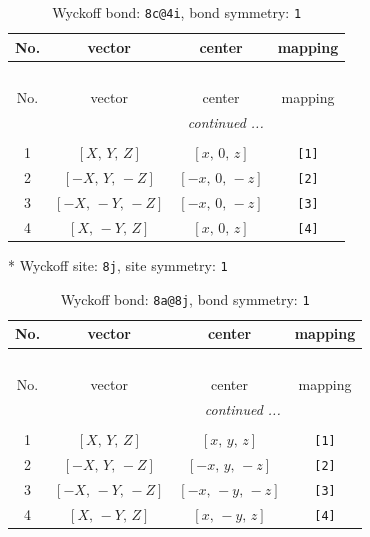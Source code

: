 \documentclass[fleqn,8pt]{jsarticle}
\begin{document}
\begin{longtable}{cccc}
\caption{Wyckoff bond: {\tt 8c@4i}, bond symmetry: {\tt 1}}
 \\
 \hline \hline
No. & vector & center & mapping \\ \hline \endfirsthead

\multicolumn{3}{l}{\tablename\ \thetable{}} \\
 \hline \hline
No. & vector & center & mapping \\ \hline \endhead

 \hline \hline
\multicolumn{3}{r}{\footnotesize\it continued ...} \\ \endfoot

 \hline \hline
\multicolumn{3}{r}{} \\ \endlastfoot

1 & $\left[ X,\, Y,\, Z \right]$ & $\left[ x,\, 0,\, z \right]$ & {\tt [1]} \\ \hline
2 & $\left[ - X,\, Y,\, - Z \right]$ & $\left[ - x,\, 0,\, - z \right]$ & {\tt [2]} \\ \hline
3 & $\left[ - X,\, - Y,\, - Z \right]$ & $\left[ - x,\, 0,\, - z \right]$ & {\tt [3]} \\ \hline
4 & $\left[ X,\, - Y,\, Z \right]$ & $\left[ x,\, 0,\, z \right]$ & {\tt [4]} \\
\end{longtable}
* Wyckoff site: {\tt 8j}, site symmetry: {\tt 1}
\renewcommand{\arraystretch}{1.2}
\begin{longtable}{cccc}
\caption{Wyckoff bond: {\tt 8a@8j}, bond symmetry: {\tt 1}}
 \\
 \hline \hline
No. & vector & center & mapping \\ \hline \endfirsthead

\multicolumn{3}{l}{\tablename\ \thetable{}} \\
 \hline \hline
No. & vector & center & mapping \\ \hline \endhead

 \hline \hline
\multicolumn{3}{r}{\footnotesize\it continued ...} \\ \endfoot

 \hline \hline
\multicolumn{3}{r}{} \\ \endlastfoot

1 & $\left[ X,\, Y,\, Z \right]$ & $\left[ x,\, y,\, z \right]$ & {\tt [1]} \\ \hline
2 & $\left[ - X,\, Y,\, - Z \right]$ & $\left[ - x,\, y,\, - z \right]$ & {\tt [2]} \\ \hline
3 & $\left[ - X,\, - Y,\, - Z \right]$ & $\left[ - x,\, - y,\, - z \right]$ & {\tt [3]} \\ \hline
4 & $\left[ X,\, - Y,\, Z \right]$ & $\left[ x,\, - y,\, z \right]$ & {\tt [4]} \\
\end{longtable}
\end{document}
